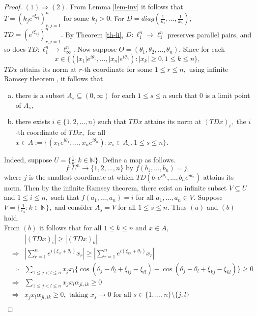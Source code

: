 \documentclass{amsart}
\theoremstyle{definition}
\theoremstyle{remark}
\numberwithin{equation}{section}
\begin{document}
\begin{proof}
	$(1)\Rightarrow (2).$ From Lemma \ref{lem-inv} it follows that 
	$T=(k_je^{i\xi_{rj}})_{r,j=1}^n \text{ for some } k_j>0.$ %
	For $D=diag(\frac{1}{k_1},\ldots,\frac{1}{k_n}),$ $TD=(e^{i\xi_{rj}})_{r,j=1}^n.$ By Theorem \ref{th-li}, $D:\ell_1^n\to \ell_1^n$ preserves parallel pairs, and so does $TD:\ell_1^n\to \ell_\infty^n.$ 
	Now suppose $\Theta=(\theta_1,\theta_2,\ldots,\theta_n).$ 
	Since for each $$x\in \Big\{(|x_1|e^{i\theta_1},\ldots, |x_n|e^{i\theta_n}):|x_k|\geq 0,1\leq k\leq n\Big\},$$ $TDx$ attains its norm at $r$-th coordinate for some $1\leq r\leq n,$ using infinite Ramsey theorem \cite{R}, it follows that
	\begin{enumerate}[(a)]
		\item there  is a subset $A_s\subseteq (0,\infty)$ for each $1\leq s\leq n$ such that $0$ is a limit point of $A_s,$
		\item there exists $i\in \{1,2,\ldots,n\}$ such that $TDx$ attains its norm at $(TDx)_i,$ the $i$-th coordinate of $TDx,$  for all $x\in A:= \{(x_1e^{i\theta_1},\ldots, x_ne^{i\theta_n}):x_s\in A_s,1\leq s\leq n\}.$ 
	\end{enumerate}
Indeed, suppose $U=\{\frac{1}{k}:k\in \mathbb{N}\}.$  Define a map as follows. 
\[f:U^n\to \{1,2,\ldots,n\} \text{ by } f(b_1,\ldots,b_n)=j,\]  where $ j$ is the smallest coordinate at which $TD(b_1e^{i\theta_1},\ldots,b_ne^{i\theta_n})$  %
attains its norm. %
Then by the infinite Ramsey theorem, there exist an infinite subset $V\subseteq U$ and $1\leq i\leq n,$ such that $f(a_1,\ldots,a_n)=i$ for all $a_1,\ldots,a_n\in V.$ Suppose $V=\{\frac{1}{r_k}:k\in \mathbb{N}\},$ and consider $A_s=V$ for all $1\leq s\leq n.$ Thus $(a)$ and $(b)$ hold.\\
	From  $(b)$ it follows that for all $1\leq k\leq n$ and $x\in A,$
	\begin{eqnarray*}
		&&|(TDx)_i|\geq|(TDx)_k|	\\
		&\Rightarrow &|\sum_{r=1}^ne^{i(\xi_{ir}+\theta_r)}x_r|\geq   |\sum_{r=1}^ne^{i(\xi_{kr}+\theta_r)}x_r|\\
		&\Rightarrow &\sum_{1\leq j<l\leq n}x_jx_l \Big\{\cos(\theta_j-\theta_l+\xi_{ij}-\xi_{il})-\cos(\theta_j-\theta_l+\xi_{kj}-\xi_{kl})\Big\}\geq 0\\
		&\Rightarrow &\sum_{1\leq j<l\leq n}x_jx_l \alpha_{jl,ik}\geq 0\\
		&\Rightarrow &x_jx_l \alpha_{jl,ik}\geq 0, \text{~taking } x_s\to 0 \text{ for all } s\in \{1,\ldots,n\}\setminus\{j,l\}\\

\end{eqnarray*}
\end{proof}
\end{document}
